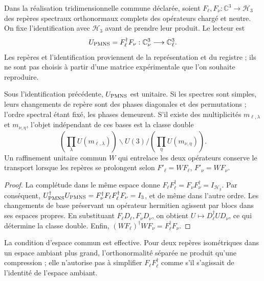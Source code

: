 \begin{definition}
Dans la réalisation tridimensionnelle commune déclarée, soient
\(F_\ell,F_\nu:\mathbb C^3\to\mathcal H_3\) des repères spectraux
orthonormaux complets des opérateurs chargé et neutre. On fixe
l'identification avec \(\mathcal H_3\) avant de prendre leur produit. Le lecteur est
\begin{equation}
 U_{\rm PMNS}=F_\ell^\dagger F_\nu:
 \mathbb C^3_\nu\longrightarrow\mathbb C^3_\ell.
 \label{eq:ii-pmns-frames}
\end{equation}
Les repères et l'identification proviennent de la représentation et du
registre ; ils ne sont pas choisis à partir d'une matrice expérimentale que l'on souhaite
reproduire.
\end{definition}

\begin{theorem}
Sous l'identification précédente, \(U_{\rm PMNS}\) est unitaire.
Si les spectres sont simples, leurs changements de repère sont des phases diagonales
et des permutations ; l'ordre spectral étant fixé, les phases demeurent.
S'il existe des multiplicités \(m_{\ell,\lambda}\) et \(m_{\nu,\eta}\),
l'objet indépendant de ces bases est la classe double
\begin{equation}
 \left(\prod_\lambda U(m_{\ell,\lambda})\right)
 \backslash U(3) /
 \left(\prod_\eta U(m_{\nu,\eta})\right).
 \label{eq:ii-pmns-double-class}
\end{equation}
Un raffinement unitaire commun \(W\) qui entrelace les deux opérateurs
conserve le transport lorsque les repères se prolongent selon
\(F'_\ell=WF_\ell\), \(F'_\nu=WF_\nu\).
\end{theorem}

\begin{proof}
La complétude dans le même espace donne
\(F_\ell F_\ell^\dagger=F_\nu F_\nu^\dagger=I_{\mathcal H_3}\).
Par conséquent,
\(U_{\rm PMNS}^\dagger U_{\rm PMNS}
=F_\nu^\dagger F_\ell F_\ell^\dagger F_\nu=I_3\), et de même
dans l'autre ordre. Les changements de base préservant un opérateur hermitien
agissent par blocs dans ses espaces propres. En substituant
\(F_\ell D_\ell,F_\nu D_\nu\), on obtient
\(U\mapsto D_\ell^\dagger UD_\nu\), ce qui détermine la classe double.
Enfin, \((WF_\ell)^\dagger WF_\nu=F_\ell^\dagger F_\nu\).
\end{proof}

La condition d'espace commun est effective. Pour deux repères isométriques dans
un espace ambiant plus grand, l'orthonormalité séparée ne produit qu'une
compression ; elle n'autorise pas à simplifier \(F_\ell F_\ell^\dagger\) comme
s'il s'agissait de l'identité de l'espace ambiant.

